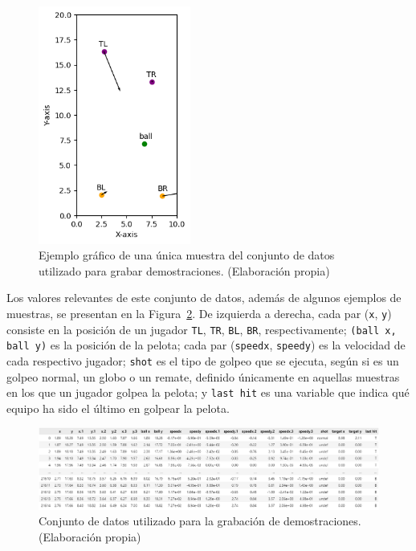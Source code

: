 \begin{figure}[H]
    \centering
    \includegraphics[width=5cm]{figures/dataset-plot.png}
    \caption[Ejemplo gráfico de una única muestra del conjunto de datos utilizado para grabar demostraciones]{Ejemplo gráfico de una única muestra del conjunto de datos utilizado para grabar demostraciones. (Elaboración propia)}
    \label{fig:dataset-plot}
\end{figure}

Los valores relevantes de este conjunto de datos, además de algunos ejemplos de muestras, se presentan en la Figura~\ref{fig:dataset-raw}. De izquierda a derecha, cada par (\texttt{x}, \texttt{y}) consiste en la posición de un jugador \texttt{TL}, \texttt{TR}, \texttt{BL}, \texttt{BR}, respectivamente; \texttt{(ball x, ball y)} es la posición de la pelota; cada par (\texttt{speedx}, \texttt{speedy}) es la velocidad de cada respectivo jugador; \texttt{shot} es el tipo de golpeo que se ejecuta, según si es un golpeo normal, un globo o un remate, definido únicamente en aquellas muestras en los que un jugador golpea la pelota; y \texttt{last hit} es una variable que indica qué equipo ha sido el último en golpear la pelota.

\begin{figure}[H]
    \centering
    \includegraphics[width=\textwidth]{figures/data.png}
    \caption[Conjunto de datos utilizado para la grabación de demostraciones]{Conjunto de datos utilizado para la grabación de demostraciones. (Elaboración propia)}
    \label{fig:dataset-raw}
\end{figure}

